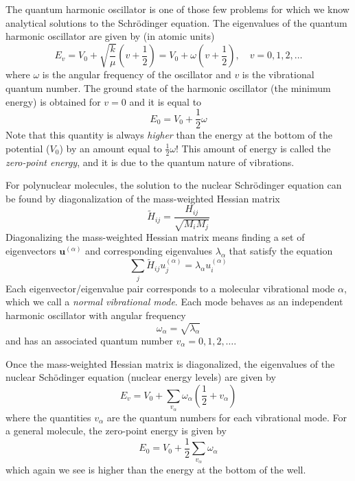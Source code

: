 \documentclass[../Main/chem371-notes.tex]{subfiles}
\begin{document}
The quantum harmonic oscillator is one of those few problems for which we know analytical solutions to the Schr\"{o}dinger equation.
The eigenvalues of the quantum harmonic oscillator are given by (in atomic units)
\begin{equation}
E_v = V_0 + \sqrt{\frac{k}{\mu}} \left(v + \frac{1}{2}\right)
= V_0 +  \omega \left(v + \frac{1}{2}\right), \quad v = 0,1,2,\ldots
\end{equation}
where $\omega$ is the angular frequency of the oscillator and $v$ is the vibrational quantum number.
The ground state of the harmonic oscillator (the minimum energy) is obtained for $v = 0$ and it is equal to
\begin{equation}
E_0 = V_0 +  \frac{1}{2}\omega
\end{equation}
Note that this quantity is always \emph{higher} than the energy at the bottom of the potential ($V_0$) by an amount equal to $\frac{1}{2}\omega$!
This amount of energy is called the \emph{zero-point energy}, and it is due to the quantum nature of vibrations.

For polynuclear molecules, the solution to the nuclear Schr\"{o}dinger equation can be found by diagonalization of the mass-weighted Hessian matrix
\begin{equation}
\tilde{H}_{ij} = \frac{H_{ij}}{\sqrt{M_i M_j}}
\end{equation}
Diagonalizing the mass-weighted Hessian matrix means finding a set of eigenvectors $\mathbf{u}^{(\alpha)}$ and corresponding eigenvalues $\lambda_\alpha$ that satisfy the equation
\begin{equation}
\sum_{j} \tilde{H}_{ij} u^{(\alpha)}_{j} = \lambda_\alpha u^{(\alpha)}_{i}
\end{equation}
Each eigenvector/eigenvalue pair corresponds to a molecular vibrational mode $\alpha$, which we call a \emph{normal vibrational mode}.
Each mode behaves as an independent harmonic oscillator with angular frequency
\begin{equation}
\omega_\alpha = \sqrt{\lambda_\alpha}
\end{equation}
and has an associated quantum number $v_\alpha = 0, 1, 2, \ldots$.

Once the mass-weighted Hessian matrix is diagonalized, the eigenvalues of the nuclear Sch\"{o}dinger equation (nuclear energy levels) are given by
\begin{equation}
E_v = V_0 + \sum_{v_\alpha} \omega_\alpha \left(\frac{1}{2} + v_\alpha\right)
\end{equation}
where the quantities $v_\alpha$ are the quantum numbers for each vibrational mode.
For a general molecule, the zero-point energy is given by
\begin{equation}
E_0 = V_0 + \frac{1}{2}  \sum_{v_\alpha} \omega_\alpha
\end{equation}
which again we see is higher than the energy at the bottom of the well.
\end{document}
